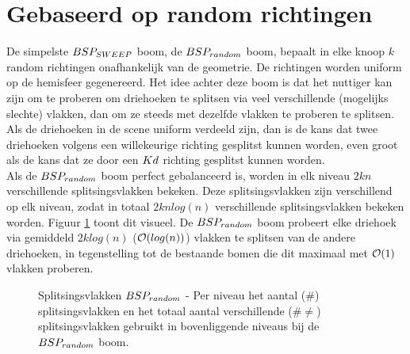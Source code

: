\section{Gebaseerd op random richtingen}
De simpelste $BSP_{SWEEP}$ boom, de $\symBSPrandom$ boom, bepaalt in elke knoop $k$ random richtingen onafhankelijk van de geometrie.
De richtingen worden uniform op de hemisfeer gegenereerd.
Het idee achter deze boom is dat het nuttiger kan zijn om te proberen om driehoeken te splitsen via veel verschillende  (mogelijks slechte) vlakken, dan om ze steeds met dezelfde vlakken te proberen te splitsen.
Als de driehoeken in de scene uniform verdeeld zijn, dan is de kans dat twee driehoeken volgens een willekeurige richting gesplitst kunnen worden, even groot als de kans dat ze door een $Kd$ richting gesplitst kunnen worden.\\

Als de $\symBSPrandom$ boom perfect gebalanceerd is, worden in elk niveau $2kn$ verschillende splitsingsvlakken bekeken.
Deze splitsingsvlakken zijn verschillend op elk niveau, zodat in totaal $2knlog(n)$ verschillende splitsingsvlakken bekeken worden.
Figuur \ref{fig:splitsingsvlakken-bsprandom} toont dit visueel.
De $\symBSPrandom$ boom probeert elke driehoek via gemiddeld $2klog(n)$ ($\mathcal{O}(log(n))$) vlakken te splitsen van de andere driehoeken, in tegenstelling tot de bestaande bomen die dit maximaal met $\mathcal{O}(1)$ vlakken proberen.\\

\begin{figure}
    \centering

   \caption[Splitsingsvlakken $\symBSPrandom$]%
    {Splitsingsvlakken $\symBSPrandom$ - \small Per niveau het aantal ($\#$) splitsingsvlakken en het totaal aantal verschillende ($\# \neq$) splitsingsvlakken gebruikt in bovenliggende niveaus bij de $\symBSPrandom$ boom.} %
    \label{fig:splitsingsvlakken-bsprandom}
\end{figure}

